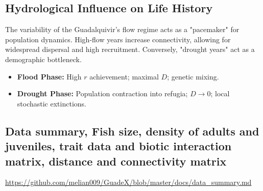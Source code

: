 \documentclass[11pt,a4paper]{article}
\begin{document}
{%

\subsection{Hydrological Influence on Life History}
The variability of the Guadalquivir's flow regime acts as a "pacemaker" for population dynamics. High-flow years increase connectivity, allowing for widespread dispersal and high recruitment. Conversely, "drought years" act as a demographic bottleneck.

\begin{itemize}
    \item \textbf{Flood Phase:} High $r$ achievement; maximal $D$; genetic mixing.
    \item \textbf{Drought Phase:} Population contraction into refugia; $D \rightarrow 0$; local stochastic extinctions.
\end{itemize}

\subsection{Data summary, Fish size, density of adults and juveniles, trait data and biotic interaction matrix, distance and connectivity matrix}
\url{https://github.com/melian009/GuadeX/blob/master/docs/data_summary.md}

}
\end{document}
